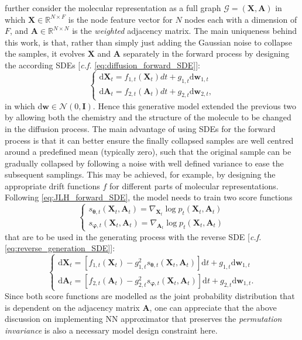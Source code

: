 \citet{jo2022score} further consider the molecular representation as a full graph $\mathcal{G}=(\bm{X},\bm{A})$ in which $\bm{X}\in\mathbb{R}^{N\times F}$ is the node feature vector for $N$ nodes each with a dimension of $F$, and $\bm{A}\in \mathbb{R}^{N\times N}$ is the \emph{weighted} adjacency matrix. The main uniqueness behind this work, is that, rather than simply just adding the Gaussian noise to collapse the samples, it evolves $\bm{X}$ and $\bm{A}$ separately in the forward process by designing the according SDEs [\emph{c.f.} \cref{eq:diffusion_forward_SDE}]:
\begin{equation}
    \label{eq:JLH_forward_SDE}
    \begin{cases}
        \mathrm{d}\bm{X}_t=f_{1,t}(\bm{X}_t)dt+g_{1,t}\mathrm{d}\bm{w}_{1,t}\\
        \mathrm{d}\bm{A}_t=f_{2,t}(\bm{A}_t)dt+g_{2,t}\mathrm{d}\bm{w}_{2,t},
    \end{cases}
\end{equation}
in  which $\mathrm{d}\bm{w}\in\mathcal{N}(0,\bm{I})$. Hence this generative model extended the previous two by allowing both the chemistry and the structure of the molecule to be changed in the diffusion process. The main advantage of using SDEs for the forward process is that it can better ensure the finally collapsed samples are well centred around a predefined mean (typically zero), such that the original sample can be gradually collapsed by following a noise with well defined variance to ease the subsequent samplings. This may be achieved, for example, by designing the appropriate drift functions $f$ for different parts of molecular representations. Following \cref{eq:JLH_forward_SDE}, the model needs to train two score functions 
\begin{equation*}
    \begin{cases}
        s_{\boldsymbol{\theta},t}(\bm{X}_t,\bm{A}_t) = \nabla_{\bm{X}_t}\log p_t(\bm{X}_t,\bm{A}_t)\\
         s_{\boldsymbol{\varphi},t}(\bm{X}_t,\bm{A}_t) = \nabla_{\bm{A}_t}\log p_t(\bm{X}_t,\bm{A}_t)
    \end{cases}
\end{equation*}
that are to be used in the generating process with the reverse SDE [\emph{c.f.} \cref{eq:reverse_generation_SDE}]:
\begin{equation*}
    \begin{cases}
        \mathrm{d}\bm{X}_t = \left[f_{1,t}(\bm{X}_t)-g_{1,t}^2s_{\boldsymbol{\theta},t}(\bm{X}_t,\bm{A}_t)\right]\mathrm{d}t +g_{1,t}\mathrm{d}\bm{w}_{1,t}\\
        \mathrm{d}\bm{A}_t = \left[f_{2,t}(\bm{A}_t)-g_{2,t}^2s_{\boldsymbol{\varphi},t}(\bm{X}_t,\bm{A}_t)\right]\mathrm{d}t +g_{2,t}\mathrm{d}\bm{w}_{1,t}.
    \end{cases}
\end{equation*}
Since both score functions are modelled as the joint probability distribution that is dependent on the adjacency matrix $\bm{A}$, one can appreciate that the above discussion on implementing NN approximator that preserves the \emph{permutation invariance} is also a necessary model design constraint here.

